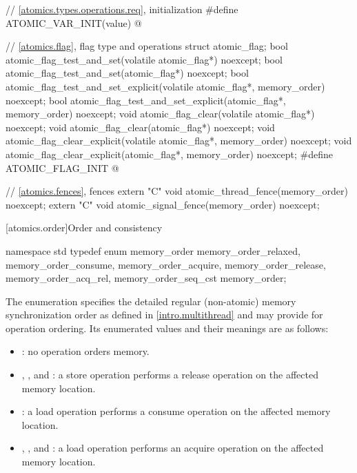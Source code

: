 \begin{codeblock}
{  // \ref{atomics.types.operations.req}, initialization
  #define ATOMIC_VAR_INIT(value) @\seebelow@

  // \ref{atomics.flag}, flag type and operations
  struct atomic_flag;
  bool atomic_flag_test_and_set(volatile atomic_flag*) noexcept;
  bool atomic_flag_test_and_set(atomic_flag*) noexcept;
  bool atomic_flag_test_and_set_explicit(volatile atomic_flag*, memory_order) noexcept;
  bool atomic_flag_test_and_set_explicit(atomic_flag*, memory_order) noexcept;
  void atomic_flag_clear(volatile atomic_flag*) noexcept;
  void atomic_flag_clear(atomic_flag*) noexcept;
  void atomic_flag_clear_explicit(volatile atomic_flag*, memory_order) noexcept;
  void atomic_flag_clear_explicit(atomic_flag*, memory_order) noexcept;
  #define ATOMIC_FLAG_INIT @\seebelow@

  // \ref{atomics.fences}, fences
  extern "C" void atomic_thread_fence(memory_order) noexcept;
  extern "C" void atomic_signal_fence(memory_order) noexcept;
}
\end{codeblock}

[atomics.order]{Order and consistency}

\begin{codeblock}
namespace std {
  typedef enum memory_order {
    memory_order_relaxed, memory_order_consume, memory_order_acquire, 
    memory_order_release, memory_order_acq_rel, memory_order_seq_cst
  } memory_order;
}
\end{codeblock}

\pnum
The enumeration  specifies the detailed regular
(non-atomic) memory synchronization order as defined in
\ref{intro.multithread} and may provide for operation ordering. Its
enumerated values and their meanings are as follows:

\begin{itemize}
\item {}: no operation orders memory.

\item {}, , and
: a store operation performs a release operation on the
affected memory location.

\item {}: a load operation performs a consume operation on the
affected memory location.

\item {}, , and
: a load operation performs an acquire operation on the
affected memory location.
\end{itemize}

